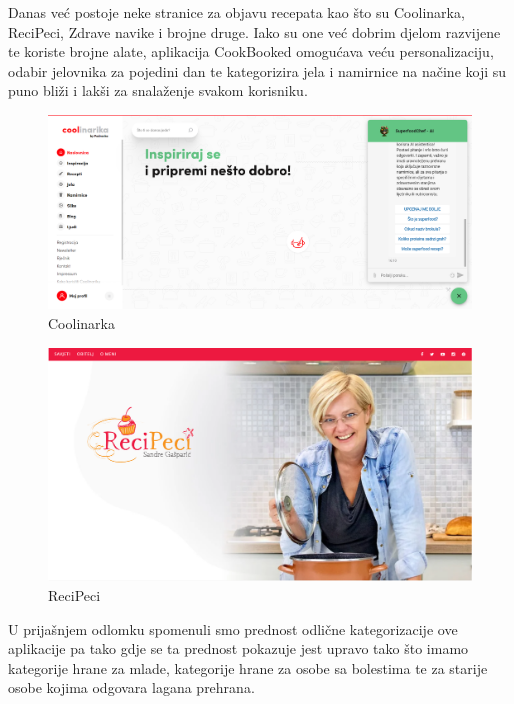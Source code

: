		\noindent Danas već postoje neke stranice za objavu recepata kao što su Coolinarka, ReciPeci, Zdrave navike i brojne druge. Iako su one već dobrim djelom razvijene te koriste brojne alate, aplikacija CookBooked omogućava veću personalizaciju, odabir jelovnika za pojedini dan te kategorizira jela i namirnice na načine koji su puno bliži i lakši za snalaženje svakom korisniku.\\

	
		\begin{figure}[H]
			\includegraphics[scale= 0.3]{slike/coolinarka.png}
			\centering
			\caption{Coolinarka}
			\label{fig:Coolinarka}
		\end{figure} 
		
		\begin{figure}[H]
			\includegraphics[scale= 0.3]{slike/recipeci.png}
			\centering
			\caption{ReciPeci}
			\label{fig:ReciPeci}
		\end{figure} 
		
		
		\noindent U prijašnjem odlomku spomenuli smo prednost odlične kategorizacije ove aplikacije pa tako gdje se ta prednost pokazuje jest upravo tako što imamo kategorije hrane za mlade, kategorije hrane za osobe sa bolestima te za starije osobe kojima odgovara lagana prehrana.\\
		
